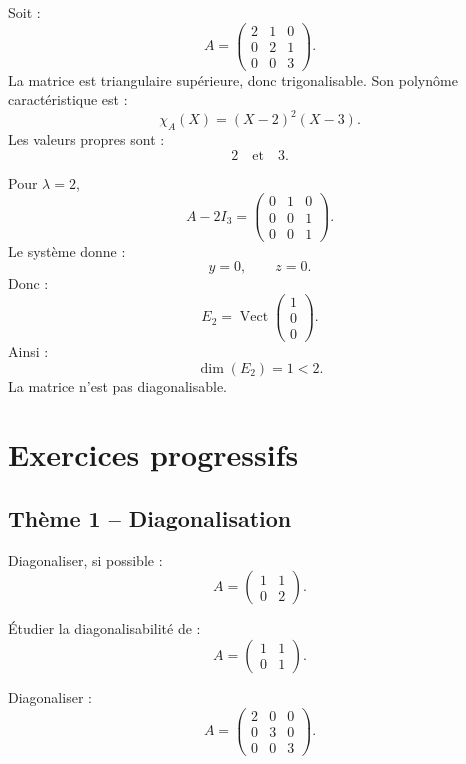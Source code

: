 \documentclass[11pt,a4paper]{article}
\newcommand{\Vect}{\operatorname{Vect}}
\begin{document}
Soit :
\[
A=
\begin{pmatrix}
2&1&0\\
0&2&1\\
0&0&3
\end{pmatrix}.
\]
La matrice est triangulaire supérieure, donc trigonalisable.  
Son polynôme caractéristique est :
\[
\chi_A(X)=(X-2)^2(X-3).
\]
Les valeurs propres sont :
\[
2
\quad\text{et}\quad
3.
\]

Pour \(\lambda=2\),
\[
A-2I_3=
\begin{pmatrix}
0&1&0\\
0&0&1\\
0&0&1
\end{pmatrix}.
\]
Le système donne :
\[
y=0,\qquad z=0.
\]
Donc :
\[
E_2=\Vect
\begin{pmatrix}
1\\0\\0
\end{pmatrix}.
\]
Ainsi :
\[
\dim(E_2)=1<2.
\]
La matrice n'est pas diagonalisable.

\newpage
\section{Exercices progressifs}

\subsection*{Thème 1 -- Diagonalisation}

\begin{exercicebox}[1]
Diagonaliser, si possible :
\[
A=
\begin{pmatrix}
1&1\\
0&2
\end{pmatrix}.
\]
\end{exercicebox}

\begin{exercicebox}[2]
Étudier la diagonalisabilité de :
\[
A=
\begin{pmatrix}
1&1\\
0&1
\end{pmatrix}.
\]
\end{exercicebox}

\begin{exercicebox}[3]
Diagonaliser :
\[
A=
\begin{pmatrix}
2&0&0\\
0&3&0\\
0&0&3
\end{pmatrix}.
\]
\end{exercicebox}
\end{document}

